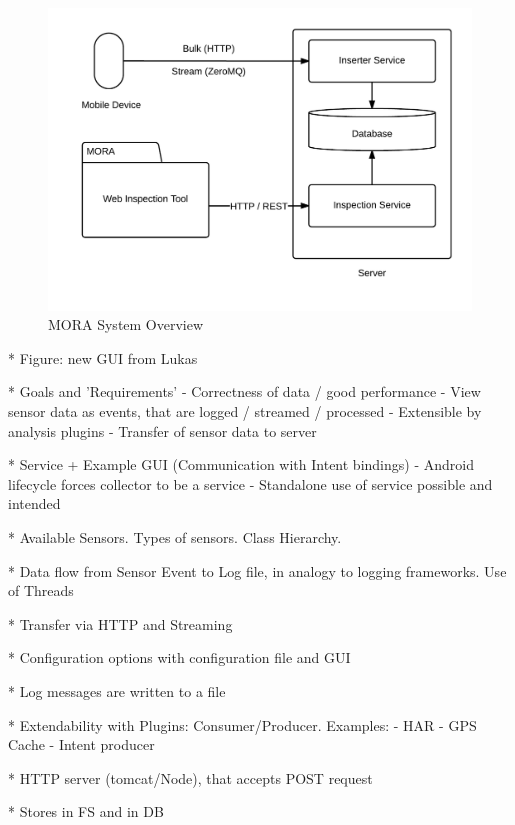 \documentclass[times, 10pt,twocolumn]{article}
\begin{document}
\begin{figure}[h]
\includegraphics[width=\linewidth]{img/system_overview.png}
\caption{MORA System Overview}
\label{overview}
\end{figure}


* Figure: new GUI from Lukas

* Goals and 'Requirements'
  - Correctness of data / good performance
  - View sensor data as events, that are logged / streamed / processed
  - Extensible by analysis plugins
  - Transfer of sensor data to server

* Service + Example GUI (Communication with Intent bindings)
  - Android lifecycle forces collector to be a service
  - Standalone use of service possible and intended

* Available Sensors. Types of sensors. Class Hierarchy.

* Data flow from Sensor Event to Log file,
  in analogy to logging frameworks.
  Use of Threads

* Transfer via HTTP and Streaming

* Configuration options with configuration file and GUI

* Log messages are written to a file

* Extendability with Plugins: Consumer/Producer. Examples:
  - HAR
  - GPS Cache
  - Intent producer


* HTTP server (tomcat/Node), that accepts POST request

* Stores in FS and in DB
\end{document}
